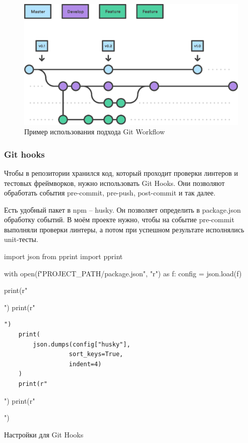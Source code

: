 \begin{figure}[h!]
    \begin{center}
        \includegraphics[scale=0.6]{images/git-workflow.eps}
    \end{center}
    \caption{Пример использования подхода Git Workflow}
\end{figure}

\subsubsection{Git hooks}
Чтобы в репозитории хранился код, который проходит проверки линтеров и тестовых фреймворков, нужно использовать Git Hooks. Они позволяют обработать события pre-commit, pre-push, post-commit и так далее.

Есть удобный пакет в npm -- husky. Он позволяет определить в package.json обработку событий. В моём проекте нужно, чтобы на событие pre-commit выполняли проверки линтеры, а потом при успешном результате исполнялись unit-тесты.

\begin{listing}[h!]
\begin{pycode}
import json
from pprint import pprint

with open(f"{PROJECT_PATH}/package.json", "r") as f:
    config = json.load(f)

    print(r"\begin{noerr}")
    print(r"\begin{verbatim}")
    print(
        json.dumps(config["husky"],
                  sort_keys=True,
                  indent=4)
    )
    print(r"\end{verbatim}")
    print(r"\end{noerr}")
\end{pycode}
\caption{Настройки для Git Hooks}
\end{listing}

\clearpage